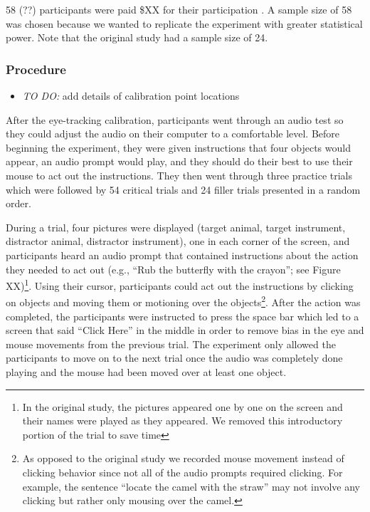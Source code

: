 \documentclass[
  english,
  man,floatsintext]{apa6}
\providecommand{\tightlist}{%
  \setlength{\itemsep}{0pt}\setlength{\parskip}{0pt}}
\begin{document}
58 (??) participants were paid \$XX for their participation . A sample size of 58 was chosen because we wanted to replicate the experiment with greater statistical power. Note that the original study had a sample size of 24.

\hypertarget{procedure-3}{%
\subsubsection{Procedure}\label{procedure-3}}

\begin{itemize}
\tightlist
\item
  \emph{TO DO:} add details of calibration point locations
\end{itemize}

After the eye-tracking calibration, participants went through an audio test so they could adjust the audio on their computer to a comfortable level. Before beginning the experiment, they were given instructions that four objects would appear, an audio prompt would play, and they should do their best to use their mouse to act out the instructions. They then went through three practice trials which were followed by 54 critical trials and 24 filler trials presented in a random order.

During a trial, four pictures were displayed (target animal, target instrument, distractor animal, distractor instrument), one in each corner of the screen, and participants heard an audio prompt that contained instructions about the action they needed to act out (e.g., ``Rub the butterfly with the crayon''; see Figure XX)\footnote{In the original study, the pictures appeared one by one on the screen and their names were played as they appeared. We removed this introductory portion of the trial to save time}. Using their cursor, participants could act out the instructions by clicking on objects and moving them or motioning over the objects\footnote{ As opposed to the original study we recorded mouse movement instead of clicking behavior since not all of the audio prompts required clicking. For example, the sentence ``locate the camel with the straw'' may not involve any clicking but rather only mousing over the camel.}. After the action was completed, the participants were instructed to press the space bar which led to a screen that said ``Click Here'' in the middle in order to remove bias in the eye and mouse movements from the previous trial. The experiment only allowed the participants to move on to the next trial once the audio was completely done playing and the mouse had been moved over at least one object.
\end{document}

